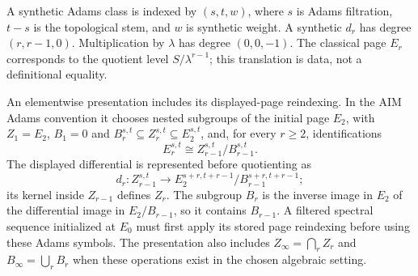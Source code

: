 \begin{definition}
  \label{def:synthetic-tridegree}
  \notready
  A synthetic Adams class is indexed by $(s,t,w)$, where $s$ is Adams
  filtration, $t-s$ is the topological stem, and $w$ is synthetic weight.  A
  synthetic $d_r$ has degree $(r,r-1,0)$.  Multiplication by $\lambda$ has
  degree $(0,0,-1)$.  The classical page $E_r$ corresponds to the quotient
  level $S/\lambda^{r-1}$; this translation is data, not a definitional
  equality.
\end{definition}

\begin{definition}
  \label{def:chosen-page-presentation}
  \notready
  An elementwise presentation includes its displayed-page reindexing.  In the
  AIM Adams convention it chooses nested subgroups of the initial page
  $E_2$, with $Z_1=E_2$, $B_1=0$ and
  $B_r^{s,t}\subseteq Z_r^{s,t}\subseteq E_2^{s,t}$, and, for every
  $r\ge2$, identifications
  \[
    E_r^{s,t}\cong Z_{r-1}^{s,t}/B_{r-1}^{s,t}.
  \]
  The displayed differential is represented before quotienting as
  \[
    d_r:Z_{r-1}^{s,t}\longrightarrow
    E_2^{s+r,t+r-1}/B_{r-1}^{s+r,t+r-1};
  \]
  its kernel inside $Z_{r-1}$ defines $Z_r$.  The subgroup $B_r$ is the
  inverse image in $E_2$ of the differential image in $E_2/B_{r-1}$, so it
  contains $B_{r-1}$.
  A filtered spectral sequence initialized at $E_0$ must first apply its
  stored page reindexing before using these Adams symbols.  The presentation
  also includes
  $Z_\infty=\bigcap_r Z_r$ and $B_\infty=\bigcup_r B_r$ when these operations
  exist in the chosen algebraic setting.
\end{definition}


